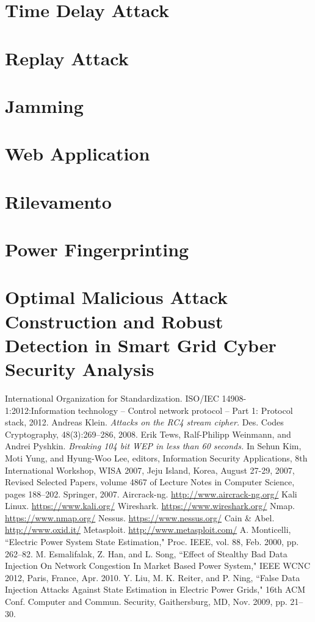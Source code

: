 \section{Time Delay Attack}
\section{Replay Attack}
\section{Jamming}
\section{Web Application}
\section{Rilevamento}
\section{Power Fingerprinting}
\section{Optimal Malicious Attack Construction and Robust Detection in Smart Grid Cyber Security Analysis}



\begin{thebibliography}{99}
 International Organization for Standardization. ISO/IEC 14908-1:2012:Information technology – Control network protocol – Part 1: Protocol stack, 2012.
 Andreas Klein. \emph{Attacks on the RC4 stream cipher.} Des. Codes Cryptography, 48(3):269–286, 2008.
 Erik Tews, Ralf-Philipp Weinmann, and Andrei Pyshkin. \emph{Breaking 104 bit WEP in less than 60 seconds.} In Sehun Kim, Moti Yung, and Hyung-Woo Lee, editors, Information Security Applications, 8th International Workshop, WISA 2007, Jeju Island, Korea, August 27-29, 2007, Revised Selected Papers, volume 4867 of Lecture Notes in Computer Science, pages 188–202. Springer, 2007.
 Aircrack-ng. \url{http://www.aircrack-ng.org/}
 Kali Linux. \url{https://www.kali.org/}
 Wireshark. \url{https://www.wireshark.org/}
 Nmap. \url{https://www.nmap.org/}
 Nessus. \url{https://www.nessus.org/}
 Cain \& Abel. \url{http://www.oxid.it/}
 Metasploit. \url{http://www.metasploit.com/}
 A. Monticelli, ``Electric Power System State Estimation," Proc. IEEE, vol. 88, Feb. 2000, pp. 262–82.
 M. Esmalifalak, Z. Han, and L. Song, ``Effect of Stealthy Bad Data Injection On Network Congestion In Market Based Power System," IEEE WCNC 2012, Paris, France, Apr. 2010.
 Y. Liu, M. K. Reiter, and P. Ning, ``False Data Injection Attacks Against State Estimation in Electric Power Grids," 16th ACM Conf. Computer and Commun. Security, Gaithersburg, MD, Nov. 2009, pp. 21–30.
\end{thebibliography}